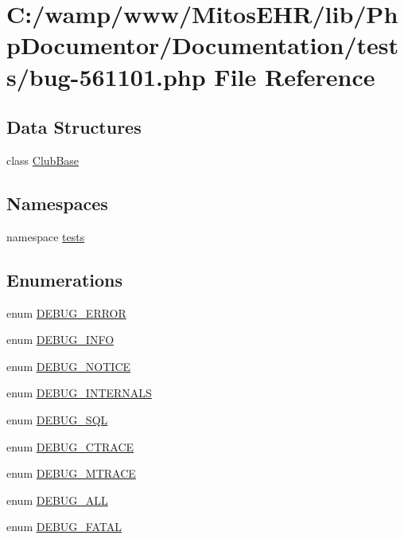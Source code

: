 \hypertarget{bug-561101_8php}{\section{\-C\-:/wamp/www/\-Mitos\-E\-H\-R/lib/\-Php\-Documentor/\-Documentation/tests/bug-\/561101.php \-File \-Reference}
\label{bug-561101_8php}
}
\subsection*{\-Data \-Structures}
\begin{DoxyCompactItemize}
\item 
class \hyperlink{class_club_base}{\-Club\-Base}
\end{DoxyCompactItemize}
\subsection*{\-Namespaces}
\begin{DoxyCompactItemize}
\item 
namespace \hyperlink{namespacetests}{tests}
\end{DoxyCompactItemize}
\subsection*{\-Enumerations}
\begin{DoxyCompactItemize}
\item 
enum \hyperlink{bug-561101_8php_a217a26c8270e25d26f6d60a96bf5abca}{\-D\-E\-B\-U\-G\-\_\-\-E\-R\-R\-O\-R} 
\item 
enum \hyperlink{bug-561101_8php_a7a4be1301dac540c466a395278786877}{\-D\-E\-B\-U\-G\-\_\-\-I\-N\-F\-O} 
\item 
enum \hyperlink{bug-561101_8php_af2b6749ec55a9dcd7880eea2bf0ac32c}{\-D\-E\-B\-U\-G\-\_\-\-N\-O\-T\-I\-C\-E} 
\item 
enum \hyperlink{bug-561101_8php_a6a8e059050dc3e86113330a22a102bf4}{\-D\-E\-B\-U\-G\-\_\-\-I\-N\-T\-E\-R\-N\-A\-L\-S} 
\item 
enum \hyperlink{bug-561101_8php_a66091a7bf636853e117ca3697950a4e2}{\-D\-E\-B\-U\-G\-\_\-\-S\-Q\-L} 
\item 
enum \hyperlink{bug-561101_8php_a29701c9bd7e90c355cc107deffbbef18}{\-D\-E\-B\-U\-G\-\_\-\-C\-T\-R\-A\-C\-E} 
\item 
enum \hyperlink{bug-561101_8php_af4088d2f82c5bcdd0689ecf59a0a920f}{\-D\-E\-B\-U\-G\-\_\-\-M\-T\-R\-A\-C\-E} 
\item 
enum \hyperlink{bug-561101_8php_a8bd96e61bf1c12ff37c7f8b9f7cc19da}{\-D\-E\-B\-U\-G\-\_\-\-A\-L\-L} 
\item 
enum \hyperlink{bug-561101_8php_a3066c1031615e2ca1476a0ccf2683122}{\-D\-E\-B\-U\-G\-\_\-\-F\-A\-T\-A\-L} 
\end{DoxyCompactItemize}
